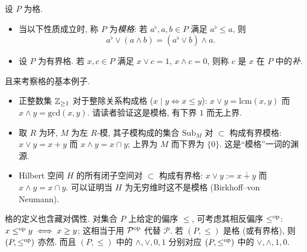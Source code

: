 \begin{definition}\label{def:modular-lattice}
	设 $P$ 为格.
	\begin{itemize}
		\item 当以下性质成立时, 称 $P$ 为\emph{模格}: 若 $a^\flat, a, b \in P$ 满足 $a^\flat \leq a$, 则
		\[ a^\flat \vee (a \wedge b) = (a^\flat \vee b) \wedge a. \]
		\item 设 $P$ 为有界格. 若 $x, c \in P$ 满足 $x \vee c = 1$, $x \wedge c = 0$, 则称 $c$ 是 $x$ 在 $P$ 中的\emph{补}.
	\end{itemize}
\end{definition}

且来考察格的基本例子.
\begin{itemize}
	\item 正整数集 $\mathbb{Z}_{\geq 1}$ 对于整除关系构成格 ($x \mid y \iff x \leq y$): $x \vee y = \mathrm{lcm}(x,y)$ 而 $x \wedge y = \mathrm{gcd}(x,y)$. 请读者验证这是模格, 有下界 $1$ 而无上界.

	\item 取 $R$ 为环, $M$ 为左 $R$-模, 其子模构成的集合 $\mathrm{Sub}_M$ 对 $\subset$ 构成有界模格: $x \vee y = x + y$ 而 $x \wedge y = x \cap y$; 上界为 $M$ 而下界为 $\{0\}$. 这是``模格''一词的渊源.
	
	\item Hilbert 空间 $H$ 的所有闭子空间对 $\subset$ 构成有界格: $x \vee y := \overline{x+y}$ 而 $x \wedge y = x \cap y$. 可以证明当 $H$ 为无穷维时这不是模格 (Birkhoff--von Neumann).
\end{itemize}

\begin{remark}\label{rem:lattice-duality}
	格的定义也含藏对偶性. 对集合 $P$ 上给定的偏序 $\leq$, 可考虑其相反偏序 $\leq^{\operatorname{op}}$: $x \leq^{\operatorname{op}} y \iff x \geq y$; 这相当于用 $\mathcal{P}^{\operatorname{op}}$ 代替 $\mathcal{P}$. 若 $(P, \leq)$ 是格 (或有界格), 则 $(P, \leq^{\operatorname{op}})$ 亦然. 而且 $(P, \leq)$ 中的 $\wedge, \vee, 0, 1$ 分别对应 $(P, \leq^{\operatorname{op}})$ 中的 $\vee, \wedge, 1, 0$.
\end{remark}

